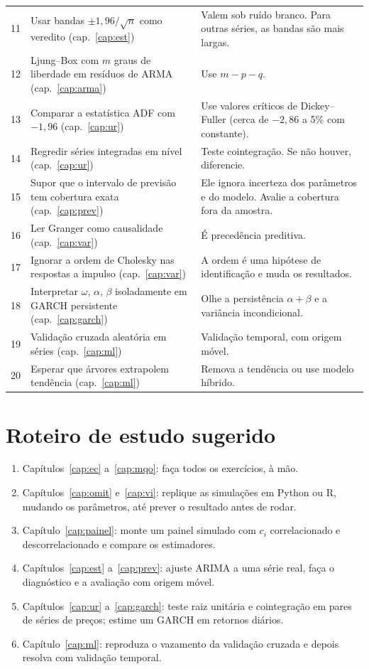 \begin{center}
\begin{longtable}{p{0.5cm}p{6.6cm}p{6.5cm}}
11 & Usar bandas $\pm1{,}96/\sqrt n$ como veredito (cap.~\ref{cap:est}) & Valem sob ruído branco. Para outras séries, as bandas são mais largas. \\
12 & Ljung--Box com $m$ graus de liberdade em resíduos de ARMA (cap.~\ref{cap:arma}) & Use $m-p-q$. \\
13 & Comparar a estatística ADF com $-1{,}96$ (cap.~\ref{cap:ur}) & Use valores críticos de Dickey--Fuller (cerca de $-2{,}86$ a 5\% com constante). \\
14 & Regredir séries integradas em nível (cap.~\ref{cap:ur}) & Teste cointegração. Se não houver, diferencie. \\
15 & Supor que o intervalo de previsão tem cobertura exata (cap.~\ref{cap:prev}) & Ele ignora incerteza dos parâmetros e do modelo. Avalie a cobertura fora da amostra. \\
16 & Ler Granger como causalidade (cap.~\ref{cap:var}) & É precedência preditiva. \\
17 & Ignorar a ordem de Cholesky nas respostas a impulso (cap.~\ref{cap:var}) & A ordem é uma hipótese de identificação e muda os resultados. \\
18 & Interpretar $\omega$, $\alpha$, $\beta$ isoladamente em GARCH persistente (cap.~\ref{cap:garch}) & Olhe a persistência $\alpha+\beta$ e a variância incondicional. \\
19 & Validação cruzada aleatória em séries (cap.~\ref{cap:ml}) & Validação temporal, com origem móvel. \\
20 & Esperar que árvores extrapolem tendência (cap.~\ref{cap:ml}) & Remova a tendência ou use modelo híbrido. \\
\bottomrule
\end{longtable}
\end{center}

\section*{Roteiro de estudo sugerido}
\begin{enumerate}[leftmargin=1.6em]
\item Capítulos~\ref{cap:ec} a~\ref{cap:mqo}: faça todos os exercícios, à mão.
\item Capítulos~\ref{cap:omit} e~\ref{cap:vi}: replique as simulações em Python ou R, mudando os parâmetros, até prever o resultado antes de rodar.
\item Capítulo~\ref{cap:painel}: monte um painel simulado com $c_i$ correlacionado e descorrelacionado e compare os estimadores.
\item Capítulos~\ref{cap:est} a~\ref{cap:prev}: ajuste ARIMA a uma série real, faça o diagnóstico e a avaliação com origem móvel.
\item Capítulos~\ref{cap:ur} a~\ref{cap:garch}: teste raiz unitária e cointegração em pares de séries de preços; estime um GARCH em retornos diários.
\item Capítulo~\ref{cap:ml}: reproduza o vazamento da validação cruzada e depois resolva com validação temporal.
\end{enumerate}
